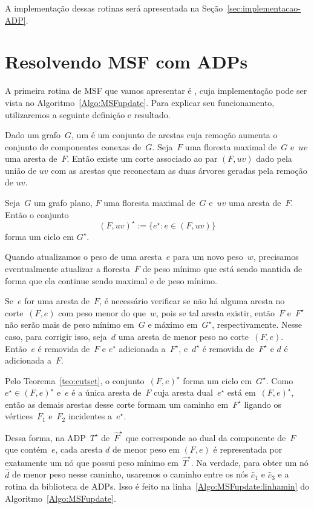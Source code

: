 A implementação dessas rotinas será apresentada na Seção~\ref{sec:implementacao-ADP}.


\section{Resolvendo MSF com ADPs}


A primeira rotina de MSF que vamos apresentar é \MSFupdate{}, cuja implementação pode ser vista no Algoritmo~\ref{Algo:MSFupdate}.
Para explicar seu funcionamento, utilizaremos a seguinte definição e resultado.

Dado um grafo~$G$, um  é um conjunto de arestas cuja remoção aumenta o conjunto de componentes conexas de~$G$.
Seja~$F$ uma floresta maximal de~$G$ e~$uv$ uma aresta de~$F$.
Então existe um corte associado ao par $(F, uv)$ dado pela união de $uv$ com as arestas que reconectam as duas árvores geradas pela remoção de $uv$.

\begin{theorem}
\label{teo:cutset}
Seja~$G$ um grafo plano, $F$ uma floresta maximal de~$G$ e~$uv$ uma aresta de~$F$.
Então o conjunto
$$
(F, uv)^\star := \{e^\star:e\in (F, uv)\}
$$
forma um ciclo em $G^\star$.
\end{theorem}

Quando atualizamos o peso de uma aresta~$e$ para um novo peso~$w$, precisamos eventualmente atualizar a floresta~$F$ de peso mínimo que está sendo mantida de forma que ela continue sendo maximal e de peso mínimo.

Se~$e$ for uma aresta de~$F$, é necessário verificar se não há alguma aresta no corte~$(F, e)$ com peso menor do que~$w$, pois se tal aresta existir, então~$F$ e~$F^\star$ não serão mais de peso mínimo em~$G$ e máximo em~$G^\star$, respectivamente.
Nesse caso, para corrigir isso, seja~$d$ uma aresta de menor peso no corte~$(F, e)$.
Então~$e$ é removida de~$F$ e $e^\star$ adicionada a~$F^\star$, e~$d^\star$ é removida de~$F^\star$ e $d$ é adicionada a~$F$.

Pelo Teorema~\ref{teo:cutset}, o conjunto~$(F, e)^\star$ forma um ciclo em~$G^\star$.
Como~$e^\star \in (F, e)^\star$ e~$e$ é a única aresta de~$F$ cuja aresta dual~$e^\star$ está em~$(F, e)^\star$, então as demais arestas desse corte formam um caminho em~$F^\star$ ligando os vértices~$F_1$ e~$F_2$ incidentes a~$e^\star$.

Dessa forma, na ADP~$T^\star$ de~$\hat F^\star$ que corresponde ao dual da componente de~$F$ que contém~$e$, cada aresta $d$ de menor peso em $(F, e)$ é representada por exatamente um nó que possui peso mínimo em~$\hat T^\star$.
Na verdade, para obter um nó $\hat d$ de menor peso nesse caminho, usaremos o caminho entre os nós $\hat e_1$ e $\hat e_3$ e a rotina \LCOMin{} da biblioteca de ADPs.
Isso é feito na linha~\ref{Algo:MSFupdate:linhamin} do Algoritmo~\ref{Algo:MSFupdate}.

